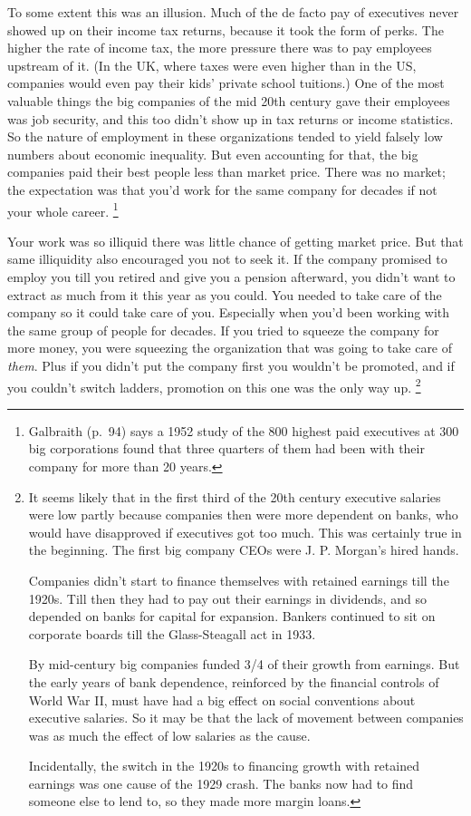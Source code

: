 To some extent this was an illusion. Much of the de facto pay of
executives never showed up on their income tax returns, because it took
the form of perks. The higher the rate of income tax, the more pressure
there was to pay employees upstream of it. (In the UK, where taxes were
even higher than in the US, companies would even pay their kids' private
school tuitions.) One of the most valuable things the big companies of
the mid 20th century gave their employees was job security, and this too
didn't show up in tax returns or income statistics. So the nature of
employment in these organizations tended to yield falsely low numbers
about economic inequality. But even accounting for that, the big
companies paid their best people less than market price. There was no
market; the expectation was that you'd work for the same company for
decades if not your whole career. \footnote{Galbraith (p.~94) says a 1952 study of the 800 highest paid
executives at 300 big corporations found that three quarters of them had
been with their company for more than 20 years.}

Your work was so illiquid there was little chance of getting market
price. But that same illiquidity also encouraged you not to seek it. If
the company promised to employ you till you retired and give you a
pension afterward, you didn't want to extract as much from it this year
as you could. You needed to take care of the company so it could take
care of you. Especially when you'd been working with the same group of
people for decades. If you tried to squeeze the company for more money,
you were squeezing the organization that was going to take care of
\emph{them}. Plus if you didn't put the company first you wouldn't be
promoted, and if you couldn't switch ladders, promotion on this one was
the only way up. \footnote{It seems likely that in the first third of the 20th century
executive salaries were low partly because companies then were more
dependent on banks, who would have disapproved if executives got too
much. This was certainly true in the beginning. The first big company
CEOs were J. P. Morgan's hired hands.

Companies didn't start to finance themselves with retained earnings till
the 1920s. Till then they had to pay out their earnings in dividends,
and so depended on banks for capital for expansion. Bankers continued to
sit on corporate boards till the Glass-Steagall act in 1933.

By mid-century big companies funded 3/4 of their growth from earnings.
But the early years of bank dependence, reinforced by the financial
controls of World War II, must have had a big effect on social
conventions about executive salaries. So it may be that the lack of
movement between companies was as much the effect of low salaries as the
cause.

Incidentally, the switch in the 1920s to financing growth with retained
earnings was one cause of the 1929 crash. The banks now had to find
someone else to lend to, so they made more margin loans.}

